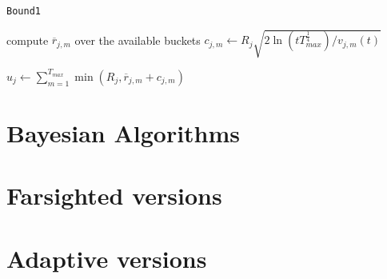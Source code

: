 \begin{algorithm}[H]
	\caption{\texttt{Bound1}}
	\begin{scriptsize}
		\begin{algorithmic}[1]
			
			
			
			
			
			\State compute $\overline{r}_{j,m}$ over the available buckets \;
			\State$c_{j,m}\gets R_j \sqrt{{2\ln(tT_{max}^{\frac{1}{4}})}/{v_{j,m}(t)}}$\;
			
			\EndFor		
			
			\State $u_j \gets \sum_{m=1}^{T_{max}} \min(R_j,\overline{r}_{j,m}+c_{j,m}) $\;	
			\EndFor
			
			
			
			
			\EndFunction
			
		\end{algorithmic}
	\end{scriptsize}
	\label{alg:Bound1}
\end{algorithm}







\section{Bayesian Algorithms}

\section{Farsighted versions}

\section{Adaptive versions}























































